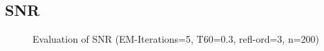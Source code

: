\subsection*{SNR}
\begin{figure}[H]
    \centering
    \begin{subfigure}{0.49\textwidth}
          \centering
	       
%            
	\end{subfigure}
    \begin{subfigure}{0.49\textwidth}
          \centering
	       
%            
	\end{subfigure}
\caption{Evaluation of SNR (EM-Iterations=5, T60=0.3, refl-ord=3, n=200)}
\end{figure}
